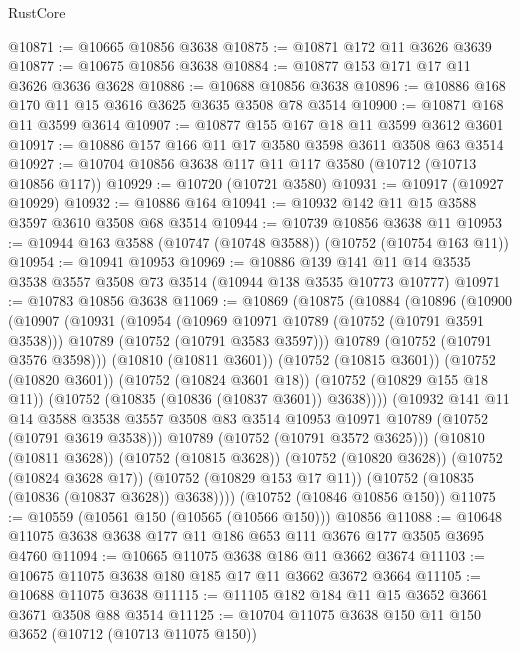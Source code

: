 \begin{lexlean}{RustCore}
\begin{coremodule}
@10871 := @10665 @10856 @3638
@10875 := @10871 @172 @11 @3626 @3639
@10877 := @10675 @10856 @3638
@10884 := @10877 @153 @171 @17 @11 @3626 @3636 @3628
@10886 := @10688 @10856 @3638
@10896 := @10886 @168 @170 @11 @15 @3616 @3625 @3635 @3508 @78 @3514
@10900 := @10871 @168 @11 @3599 @3614
@10907 := @10877 @155 @167 @18 @11 @3599 @3612 @3601
@10917 := @10886 @157 @166 @11 @17 @3580 @3598 @3611 @3508 @63 @3514
@10927 := @10704 @10856 @3638 @117 @11 @117 @3580 (@10712 (@10713 @10856 @117))
@10929 := @10720 (@10721 @3580)
@10931 := @10917 (@10927 @10929)
@10932 := @10886 @164
@10941 := @10932 @142 @11 @15 @3588 @3597 @3610 @3508 @68 @3514
@10944 := @10739 @10856 @3638 @11
@10953 := @10944 @163 @3588 (@10747 (@10748 @3588)) (@10752 (@10754 @163 @11))
@10954 := @10941 @10953
@10969 := @10886
    @139
    @141
    @11
    @14
    @3535
    @3538
    @3557
    @3508
    @73
    @3514
    (@10944 @138 @3535 @10773 @10777)
@10971 := @10783 @10856 @3638
@11069 := @10869
    (@10875
      (@10884
        (@10896
          (@10900
            (@10907
              (@10931
                (@10954
                  (@10969 @10971 @10789 (@10752 (@10791 @3591 @3538)))
                  @10789
                  (@10752 (@10791 @3583 @3597)))
                @10789
                (@10752 (@10791 @3576 @3598)))
              (@10810 (@10811 @3601))
              (@10752 (@10815 @3601))
              (@10752 (@10820 @3601))
              (@10752 (@10824 @3601 @18))
              (@10752 (@10829 @155 @18 @11))
              (@10752 (@10835 (@10836 (@10837 @3601)) @3638))))
          (@10932
            @141
            @11
            @14
            @3588
            @3538
            @3557
            @3508
            @83
            @3514
            @10953
            @10971
            @10789
            (@10752 (@10791 @3619 @3538)))
          @10789
          (@10752 (@10791 @3572 @3625)))
        (@10810 (@10811 @3628))
        (@10752 (@10815 @3628))
        (@10752 (@10820 @3628))
        (@10752 (@10824 @3628 @17))
        (@10752 (@10829 @153 @17 @11))
        (@10752 (@10835 (@10836 (@10837 @3628)) @3638))))
    (@10752 (@10846 @10856 @150))
@11075 := @10559 (@10561 @150 (@10565 (@10566 @150))) @10856
@11088 := @10648 @11075 @3638 @3638 @177 @11 @186 @653 @111 @3676 @177 @3505 @3695 @4760
@11094 := @10665 @11075 @3638 @186 @11 @3662 @3674
@11103 := @10675 @11075 @3638 @180 @185 @17 @11 @3662 @3672 @3664
@11105 := @10688 @11075 @3638
@11115 := @11105 @182 @184 @11 @15 @3652 @3661 @3671 @3508 @88 @3514
@11125 := @10704 @11075 @3638 @150 @11 @150 @3652 (@10712 (@10713 @11075 @150))

\end{coremodule}
\end{lexlean}

